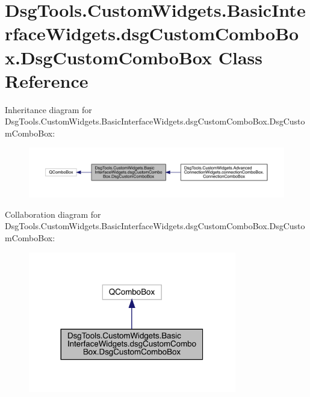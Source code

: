 \hypertarget{class_dsg_tools_1_1_custom_widgets_1_1_basic_interface_widgets_1_1dsg_custom_combo_box_1_1_dsg_custom_combo_box}{}\section{Dsg\+Tools.\+Custom\+Widgets.\+Basic\+Interface\+Widgets.\+dsg\+Custom\+Combo\+Box.\+Dsg\+Custom\+Combo\+Box Class Reference}
\label{class_dsg_tools_1_1_custom_widgets_1_1_basic_interface_widgets_1_1dsg_custom_combo_box_1_1_dsg_custom_combo_box}


Inheritance diagram for Dsg\+Tools.\+Custom\+Widgets.\+Basic\+Interface\+Widgets.\+dsg\+Custom\+Combo\+Box.\+Dsg\+Custom\+Combo\+Box\+:
\nopagebreak
\begin{figure}[H]
\begin{center}
\leavevmode
\includegraphics[width=350pt]{class_dsg_tools_1_1_custom_widgets_1_1_basic_interface_widgets_1_1dsg_custom_combo_box_1_1_dsg_custom_combo_box__inherit__graph}
\end{center}
\end{figure}


Collaboration diagram for Dsg\+Tools.\+Custom\+Widgets.\+Basic\+Interface\+Widgets.\+dsg\+Custom\+Combo\+Box.\+Dsg\+Custom\+Combo\+Box\+:
\nopagebreak
\begin{figure}[H]
\begin{center}
\leavevmode
\includegraphics[width=257pt]{class_dsg_tools_1_1_custom_widgets_1_1_basic_interface_widgets_1_1dsg_custom_combo_box_1_1_dsg_custom_combo_box__coll__graph}
\end{center}
\end{figure}
